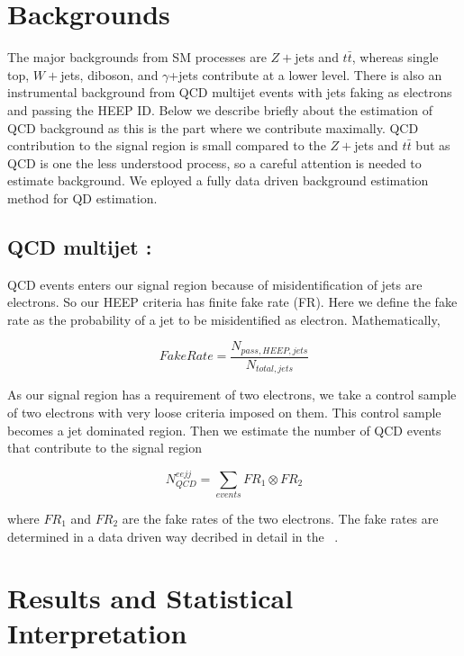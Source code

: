 \begin{table}[h]
\begin{center}
\end{center}
\end{table}


\section{ Backgrounds}

The major backgrounds from SM processes are $Z+$jets and $t\bar{t}$, whereas single top, $W+$jets, diboson, and $\gamma$+jets contribute at a lower level. There is also an instrumental background from QCD multijet events with jets faking as electrons and passing the HEEP ID. Below we describe briefly about the estimation of QCD background as this is the part where we contribute maximally. QCD contribution to the signal region is small compared to the $Z+$jets and $t\bar{t}$ but as QCD is one the less understood process, so a careful attention is needed to estimate background. We eployed a fully data driven background estimation method for QD estimation.

\subsection{QCD multijet :}
QCD events enters our signal region because of misidentification of jets are electrons. So our HEEP criteria has finite fake rate (FR). Here we define the fake rate as the probability of a jet to be misidentified as electron. Mathematically,

  \begin{equation}
    Fake Rate = \frac{N_{pass,HEEP,jets}}{N_{total,jets}}
    \label{eq:FakeRate}
  \end{equation}

As our signal region has a requirement of two electrons, we take a control sample of two electrons with very loose criteria imposed on them. This control sample becomes a jet dominated region. Then we estimate the number of QCD events that contribute to the signal region 

   \begin{equation}
    N_{QCD}^{eejj} = \sum_{events} FR_{1}\otimes FR_{2}
    \label{eq:FakeRate}
  \end{equation}

where $FR_{1}$ and $FR_{2}$ are the fake rates of the two electrons. The fake rates are determined in a data driven way decribed in detail in the ~\cite{CMS-PAS-EXO-16-043}.


\section{Results and Statistical Interpretation}

